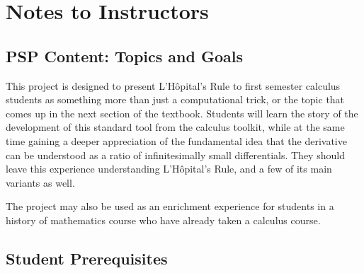 \message{ !name(LHopitalsRule_2021.03.29.tex)}\documentclass[11pt]{article}
\begin{document}
\nocite{*}%
 
      {}                                                                                             %

\newpage



\section*{Notes to Instructors}

  \vspace*{-6pt}
\subsection*{PSP Content: Topics and Goals}


  \vspace*{-3pt}
This project is designed to present L'H\^opital's Rule to first semester calculus students as something more than just a computational trick, or the topic that comes up in the next section of the textbook. Students will learn the story of the development of this standard tool from the calculus toolkit, while at the same time gaining a deeper appreciation of the fundamental idea that the derivative can be understood as a ratio of infinitesimally small differentials. They should leave this experience understanding L'H\^opital's Rule, and a few of its main variants as well.

The project may also be used as an enrichment experience for students in a history of mathematics course who have already taken a calculus course.

  \vspace*{-6pt}

\subsection*{Student Prerequisites}
\end{document}
